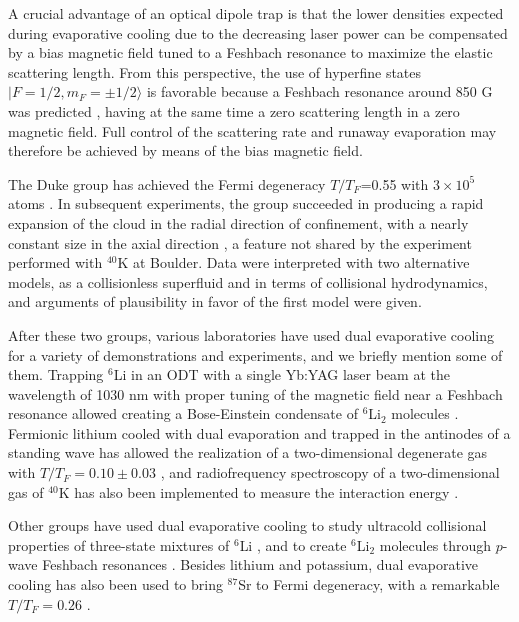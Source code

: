 \documentclass[pra,letterpaper,twocolumn,showpacs,superscriptaddress]{revtex4}
\begin{document}
A crucial advantage of an optical dipole trap is that the lower densities expected during 
evaporative cooling due to the decreasing laser power can be compensated by a bias magnetic field 
tuned to a Feshbach resonance to maximize the elastic scattering length.
From this perspective, the use of hyperfine states $|F=1/2, m_F=\pm 1/2 \rangle$ is favorable because 
a Feshbach resonance around 850 G was predicted \cite{Houbiers1997}, having at the same time 
a zero scattering length in a zero magnetic field. Full control of the scattering rate and runaway 
evaporation may therefore be achieved by means of the bias magnetic field. 

The Duke group has achieved the Fermi degeneracy $T/T_F$=0.55 with $3 \times 10^5$ atoms \cite{Granade2002}. In subsequent experiments, 
the group succeeded in producing a rapid expansion of the cloud in the radial direction of confinement, with a nearly 
constant size in the axial direction \cite{Ohara2002}, a feature not shared by the experiment performed with ${}^{40}$K at Boulder. 
Data were interpreted with two alternative models, as a collisionless superfluid and in terms of collisional hydrodynamics, and 
arguments of plausibility in favor of the first model were given. 

After these two groups, various laboratories have used dual evaporative cooling for a variety of demonstrations 
and experiments, and we briefly mention some of them. Trapping ${}^6$Li in an ODT with a single Yb:YAG laser beam at the wavelength of 1030 nm with proper 
tuning of the magnetic field near a Feshbach resonance allowed creating a Bose-Einstein condensate of ${}^{6}$Li${}_2$ molecules \cite{Jochim2003,Fuchs2007}.
Fermionic lithium cooled with dual evaporation and trapped in the antinodes of a standing wave has allowed the 
realization of a two-dimensional degenerate gas with $T/T_F=0.10 \pm 0.03$ \cite{Martiyanov2010a,Martiyanov2010b}, 
and radiofrequency spectroscopy of a two-dimensional gas of ${}^{40}$K has also been implemented to measure the interaction energy 
\cite{Frohlich2011}. 

Other groups have used dual evaporative cooling to study ultracold collisional properties of three-state mixtures of 
${}^6$Li \cite{Ottenstein2008,Huckans2009}, and to create ${}^6$Li${}_2$ molecules through $p$-wave Feshbach resonances \cite{Inada2008}. 
Besides lithium and potassium, dual evaporative cooling has also been used to bring ${}^{87}$Sr to Fermi degeneracy, with a remarkable 
$T/T_F =0.26$ \cite{DeSalvo2010}. 
\end{document}
